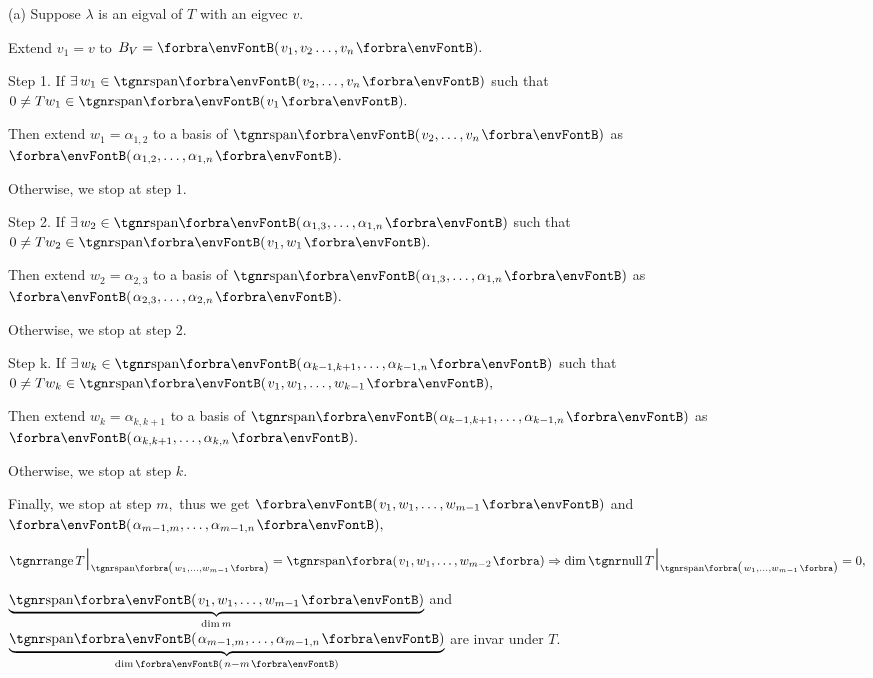 \documentclass[a4paper, 11pt, UTF8]{article}
\begin{document}
\begin{large}
\par\quad
(a) Suppose $\lambda$ is an eigval of $T$ with an eigvec $v.$ \par\quad\Ha
Extend $v_1=v$ to $B_V=\Par{v_1,v_2\dots,v_n}.$\par\quad\Ha
{\tgbfx Step 1.} If $\exists\,w_1\in\Span{v_2,\dots,v_n}$ such that $0\neq Tw_1\in\Span{v_1}.$\par\quad\Ha
{} Then extend $w_1=\alpha_{1,2}$ to a basis of $\Span{v_2,\dots,v_n}$ as $\Par{\alpha_{1,2},\dots,\alpha_{1,n}}.$\par\quad\Ha
{} Otherwise, we stop at step $1.$\par\quad\Ha
{\tgbfx Step 2.} If $\exists\,w_2\in\Span{\alpha_{1,3},\dots,\alpha_{1,n}}$ such that $0\neq Tw_2\in\Span{v_1,w_1}.$\par\quad\Ha
{} Then extend $w_2=\alpha_{2,3}$ to a basis of $\Span{\alpha_{1,3},\dots,\alpha_{1,n}}$ as $\Par{\alpha_{2,3},\dots,\alpha_{2,n}}.$\par\quad\Ha
{} Otherwise, we stop at step $2.$\par\quad\Ha
{\tgbfx Step k.} If $\exists\,w_k\in\Span{\alpha_{k-1,k+1},\dots,\alpha_{k-1,n}}$ such that $0\neq Tw_k\in\Span{v_1,w_1,\dots,w_{k-1}},$\par\quad\Ha
{} Then extend $w_k=\alpha_{k,k+1}$ to a basis of $\Span{\alpha_{k-1,k+1},\dots,\alpha_{k-1,n}}$ as $\Par{\alpha_{k,k+1},\dots,\alpha_{k,n}}.$\par\quad\Ha
{} Otherwise, we stop at step $k.$\par\vspace{4pt}\quad\Ha
Finally, we stop at step $m,$ thus we get $\Par{v_1,w_1,\dots,w_{m-1}}$ and $\Par{\alpha_{m-1,m},\dots,\alpha_{m-1,n}},$\par\quad\Ha
$\range T\envFontLarge\mid\envFontDefault_{\Span{w_1,\dots,w_{m-1}}}=\Span{v_1,w_1,\dots,w_{m-2}}\Rightarrow\dim\null T\envFontLarge\mid\envFontDefault_{\Span{w_1,\dots,w_{m-1}}}=0,$\par\quad\Ha
$\underbrace{\Span{v_1,w_1,\dots,w_{m-1}}}_{\dim m}$ and $\underbrace{\Span{\alpha_{m-1,m},\dots,\alpha_{m-1,n}}}_{\dim \Par{n-m}}$ are invar under $T.$\par\quad\Ha

\end{large}
\end{document}
